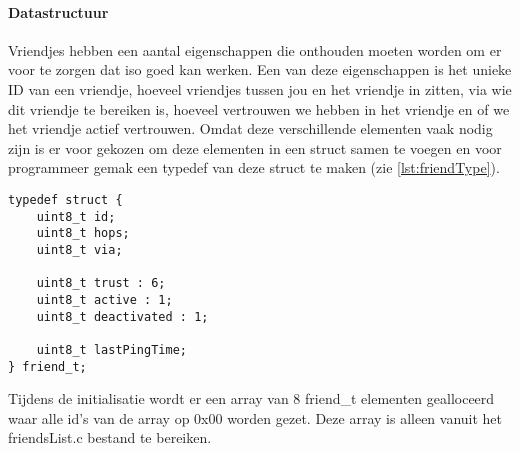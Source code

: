     \paragraph{Datastructuur}
        Vriendjes hebben een aantal eigenschappen die onthouden moeten worden om er voor te zorgen dat iso goed kan werken. Een van deze eigenschappen is het unieke ID van een vriendje, hoeveel vriendjes tussen jou en het vriendje in zitten, via wie dit vriendje te bereiken is, hoeveel vertrouwen we hebben in het vriendje en of we het vriendje actief vertrouwen. Omdat deze verschillende elementen vaak nodig zijn is er voor gekozen om deze elementen in een struct samen te voegen en voor programmeer gemak een typedef van deze struct te maken (zie \autoref{lst:friendType}). 
\begin{lstlisting}[caption={Vriendjes struct},captionpos=b,label={lst:friendType},style=c]
typedef struct {
    uint8_t id;
    uint8_t hops;
    uint8_t via;
    
    uint8_t trust : 6;
    uint8_t active : 1;
    uint8_t deactivated : 1;
        
    uint8_t lastPingTime;
} friend_t;
\end{lstlisting}

        Tijdens de initialisatie wordt er een array van 8 friend\_t elementen gealloceerd waar alle id's van de array op 0x00 worden gezet. Deze array is alleen vanuit het friendsList.c bestand te bereiken.


